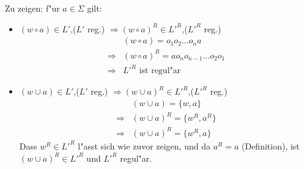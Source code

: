 \documentclass[a4paper,twoside,12pt,fleqn]{article}
\begin{document}
\begin{description}
\begin{enumerate}
\begin{enumerate}
			Zu zeigen: f"ur $a \in \Sigma$ gilt:
			\begin{itemize}
				\item $(w \circ a) \in L'$,($L'$ reg.) $\Rightarrow
					(w\circ a)^R \in L'^R$,($L'^R$ reg.)
					\begin{align*}
						&(w\circ a) = o_1o_2\dots o_na\\
						\Rightarrow &(w\circ a)^R = ao_no_{n-1}\dots o_2o_1\\
						\Rightarrow &L'^R \text{ ist regul"ar}
					\end{align*}
				\item $(w\cup a) \in L'$,($L'$ reg.) $\Rightarrow
					(w\cup a)^R \in L'^R$,($L'^R$ reg.)
					\begin{align*}
						&(w\cup a) = \{w, a\}\\
						\Rightarrow &(w\cup a)^R = \{w^R, a^R\}\\
						\Rightarrow &(w\cup a)^R = \{w^R, a\}
					\end{align*}
					Dass $w^R \in L'^R$ l"asst sich wie zuvor zeigen, und da
					$a^R = a$ (Definition), ist $(w\cup a)^R \in L'^R$ und
					$L'^R$ regul"ar.
			\end{itemize}
	\end{enumerate}
	\end{enumerate}

\end{description}
\end{document}
